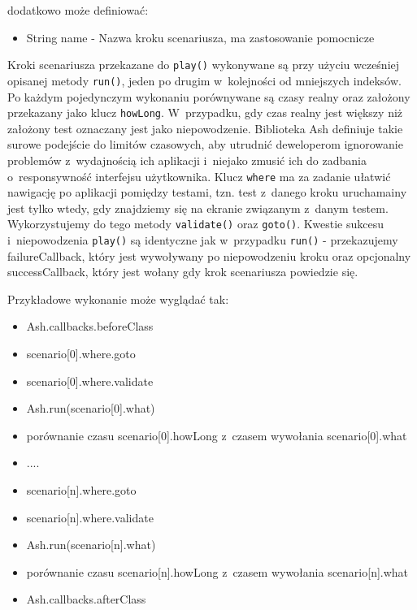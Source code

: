 \documentclass[brudnopis]{xmgr}
\begin{document}
dodatkowo może definiować:

\begin{itemize} 
  \item String name - Nazwa kroku scenariusza, ma zastosowanie pomocnicze
\end{itemize}

Kroki scenariusza przekazane do \texttt{play()} wykonywane są przy użyciu wcześniej opisanej metody \texttt{run()}, jeden po drugim w~kolejności od mniejszych indeksów. Po każdym pojedynczym wykonaniu porównywane są czasy realny oraz założony przekazany jako klucz \texttt{howLong}. W~przypadku, gdy czas realny jest większy niż założony test oznaczany jest jako niepowodzenie. Biblioteka Ash definiuje takie surowe podejście do limitów czasowych, aby utrudnić deweloperom ignorowanie problemów z~wydajnością ich aplikacji i~niejako zmusić ich do zadbania o~responsywność interfejsu użytkownika. Klucz \texttt{where} ma za zadanie ułatwić nawigację po aplikacji pomiędzy testami, tzn. test z~danego kroku uruchamainy jest tylko wtedy, gdy znajdziemy się na ekranie związanym z~danym testem. Wykorzystujemy do tego metody \texttt{validate()} oraz \texttt{goto()}. Kwestie sukcesu i~niepowodzenia \texttt{play()} są identyczne jak w~przypadku \texttt{run()} - przekazujemy failureCallback, który jest wywoływany po niepowodzeniu kroku oraz opcjonalny successCallback,  który jest wołany gdy krok scenariusza powiedzie się. 

Przykładowe wykonanie może wyglądać tak:

\begin{itemize}
  \item Ash.callbacks.beforeClass
  \item scenario[0].where.goto
  \item scenario[0].where.validate
  \item Ash.run(scenario[0].what)
  \item porównanie czasu scenario[0].howLong z~czasem wywołania scenario[0].what
  \item ....
  \item scenario[n].where.goto
  \item scenario[n].where.validate
  \item Ash.run(scenario[n].what)
  \item porównanie czasu scenario[n].howLong z~czasem wywołania scenario[n].what
  \item Ash.callbacks.afterClass
\end{itemize}
\end{document}
